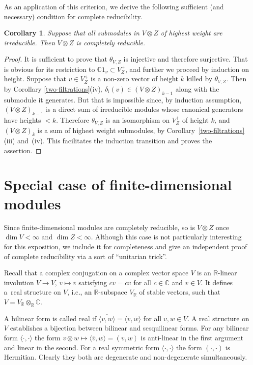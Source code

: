 \documentclass[pdftex]{sigma}
\numberwithin{equation}{section}
\newtheorem{Corollary}[Theorem]{Corollary}
\begin{document}
As an application of this criterion, we derive the following sufficient (and necessary) condition for complete reducibility.
\begin{Corollary}\label{dir-sum_irred} Suppose that all submodules in $V\otimes Z$ of highest weight are irreducible. Then $V\otimes Z$ is completely reducible.
\end{Corollary}
\begin{proof} It is sufficient to prove that $\theta_{V,Z}$ is injective and therefore surjective. That is obvious for its restriction to $\mathbb{C} 1_\nu\subset V^+_Z$, and further we proceed by induction on height.
Suppose that $v\in V^+_Z$ is a non-zero vector of height $k$ killed by $\theta_{V,Z}$. Then by Corollary \ref{two-filtrations}(iv), $\delta_l(v)\in (V\otimes Z)_{k-1}$ along with the submodule it generates. But that is impossible since, by induction assumption, $(V\otimes Z)_{k-1}$ is a direct sum of irreducible modules whose canonical generators have heights $< k$. Therefore $\theta_{V,Z}$ is an isomorphism on $ V^+_Z$ of height $k$, and $(V\otimes Z)_{k}$ is a sum of highest weight submodules, by Corollary~\ref{two-filtrations}(iii) and~(iv). This facilitates the induction transition and proves the assertion.
\end{proof}

\section{Special case of finite-dimensional modules}
Since finite-dimensional modules are completely reducible, so is $V\otimes Z$ once $\dim V<\infty$ and $\dim Z<\infty$. Although this case is not particularly interesting for this exposition, we include it for completeness and give an independent proof of complete reducibility via a sort of ``unitarian trick''.

Recall that a complex conjugation on a complex vector space $V$ is an $\mathbb{R}$-linear involution $V\to V$, $v\mapsto \bar v$ satisfying $\overline{c v}=\bar c \bar v$ for all $c\in \mathbb{C}$ and $v\in V$. It defines a~real structure on $V$, i.e., an $\mathbb{R}$-subspace $V_\mathbb{R}$ of stable vectors, such that $V=V_\mathbb{R}\otimes _\mathbb{R} \mathbb{C}$.

A bilinear form is called real if $\overline{\langle v,w \rangle }=\langle \bar v,\bar w \rangle $ for all $v,w\in V$. A real structure on $V$ establishes a bijection between bilinear and sesquilinear forms. For any bilinear form $\langle \cdot,\cdot\rangle$ the form $v\otimes w\mapsto \langle \bar v, w\rangle= (v, w)$ is anti-linear in the first argument and linear in the second. For a real symmetric form $\langle \cdot,\cdot\rangle$ the form $(\cdot,\cdot)$ is Hermitian. Clearly they both are degenerate and non-degenerate simultaneously.
\end{document}
